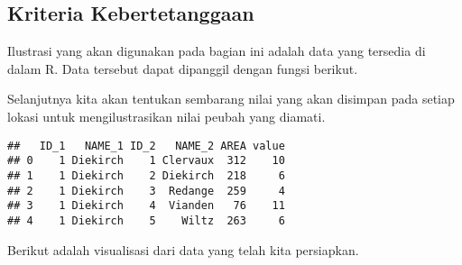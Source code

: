 \documentclass[
]{book}
\newenvironment{Shaded}{\begin{snugshade}}{\end{snugshade}}
\newcommand{\DataTypeTok}[1]{\textcolor[rgb]{0.13,0.29,0.53}{#1}}
\newcommand{\DecValTok}[1]{\textcolor[rgb]{0.00,0.00,0.81}{#1}}
\newcommand{\KeywordTok}[1]{\textcolor[rgb]{0.13,0.29,0.53}{\textbf{#1}}}
\newcommand{\NormalTok}[1]{#1}
\newcommand{\OperatorTok}[1]{\textcolor[rgb]{0.81,0.36,0.00}{\textbf{#1}}}
\newcommand{\StringTok}[1]{\textcolor[rgb]{0.31,0.60,0.02}{#1}}
\begin{document}
\hypertarget{kriteria-kebertetanggaan}{%
\subsection{Kriteria Kebertetanggaan}\label{kriteria-kebertetanggaan}}

Ilustrasi yang akan digunakan pada bagian ini adalah data yang tersedia di dalam R. Data tersebut dapat dipanggil dengan fungsi berikut.

\begin{Shaded}
\end{Shaded}

Selanjutnya kita akan tentukan sembarang nilai yang akan disimpan pada setiap lokasi untuk mengilustrasikan nilai peubah yang diamati.

\begin{Shaded}
\end{Shaded}

\begin{verbatim}
##   ID_1   NAME_1 ID_2   NAME_2 AREA value
## 0    1 Diekirch    1 Clervaux  312    10
## 1    1 Diekirch    2 Diekirch  218     6
## 2    1 Diekirch    3  Redange  259     4
## 3    1 Diekirch    4  Vianden   76    11
## 4    1 Diekirch    5    Wiltz  263     6
\end{verbatim}

Berikut adalah visualisasi dari data yang telah kita persiapkan.
\end{document}
